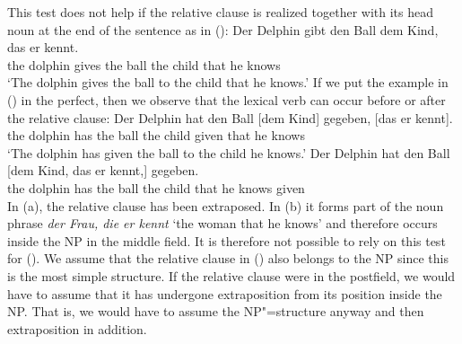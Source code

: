 \noindent
This test does not help if the relative clause is realized together with its head noun at the end of the sentence as in ():
\ea
\gll Der Delphin gibt den Ball dem Kind, das er kennt.\\
     the dolphin gives the ball the child that he knows\\
\glt `The dolphin gives the ball to the child that he knows.'
\z
If we put the example in () in the perfect, then we observe that the lexical verb can occur before or after the relative clause:
\eal
\ex 
\gll Der Delphin hat den Ball [dem Kind] gegeben, [das er kennt].\\
     the dolphin has the ball \spacebr{}the child given \spacebr{}that he knows\\
\glt `The dolphin has given the ball to the child he knows.'
\ex 
\gll Der Delphin hat den Ball [dem Kind, das er kennt,] gegeben.\\
     the dolphin has the ball \spacebr{}the child that he knows given\\
\zl
In (a), the relative clause has been extraposed. In (b) it forms part of the noun phrase \emph{der Frau, die er kennt} `the woman that he knows'
and therefore occurs inside the NP in the middle field. It is therefore not possible to rely on this test for (). We assume that the relative clause in ()
also belongs to the NP since this is the most simple structure. If the relative clause were in the
postfield, we would have to assume that it has undergone extraposition from its position inside
the NP. That is, we would have to assume the NP"=structure anyway and then extraposition in addition.%
%

